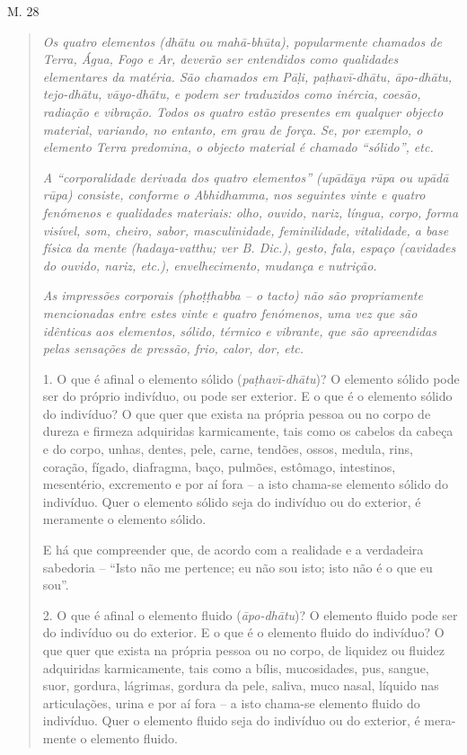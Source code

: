 M. 28

\begin{quote}
\emph{Os quatro elementos (dhātu ou mahā-bhūta), popularmente chamados de Terra, Água, Fogo e Ar, deverão ser entendidos como qualidades elementares da matéria. São chamados em Pāḷi, paṭhavī-dhātu, āpo-dhātu, tejo-dhātu, vāyo-dhātu, e podem ser traduzidos como inércia, coesão, radiação e vibração. Todos os quatro estão presentes em qualquer objecto material, variando, no entanto, em grau de força. Se, por exemplo, o elemento Terra predomina, o objecto material é chamado ``sólido'', etc.}

\emph{A ``corporalidade derivada dos quatro elementos'' (upādāya rūpa ou upādā rūpa) consiste, conforme o Abhidhamma, nos seguintes vinte e quatro fenómenos e qualidades materiais: olho, ouvido, nariz, língua, corpo, forma visível, som, cheiro, sabor, masculinidade, feminilidade, vitalidade, a base física da mente (hadaya-vatthu; ver B. Dic.), gesto, fala, espaço (cavidades do ouvido, nariz, etc.), envelhecimento, mudança e nutrição.}

\emph{As impressões corporais (phoṭṭhabba -- o tacto) não são propriamente mencionadas entre estes vinte e quatro fenómenos, uma vez que são idênticas aos elementos, sólido, térmico e vibrante, que são apreendidas pelas sensações de pressão, frio, calor, dor, etc.}

1. O que é afinal o elemento sólido (\emph{paṭhavī-dhātu})? O elemento sólido pode ser do próprio indivíduo, ou pode ser exterior. E o que é o elemento sólido do indivíduo? O que quer que exista na própria pessoa ou no corpo de dureza e firmeza adquiridas karmicamente, tais como os cabelos da cabeça e do corpo, unhas, dentes, pele, carne, tendões, ossos, medula, rins, coração, fígado, diafragma, baço, pulmões, estômago, intestinos, mesentério, excremento e por aí fora -- a isto chama-se elemento sólido do indivíduo. Quer o elemento sólido seja do indivíduo ou do exterior, é meramente o elemento sólido.

E há que compreender que, de acordo com a realidade e a verdadeira sabedoria -- ``Isto não me pertence; eu não sou isto; isto não é o que eu sou''.

2. O que é afinal o elemento fluido (\emph{āpo-dhātu})? O elemento fluido pode ser do indivíduo ou do exterior. E o que é o elemento fluido do indivíduo? O que quer que exista na própria pessoa ou no corpo, de liquidez ou fluidez adquiridas karmicamente, tais como a bílis, mucosidades, pus, sangue, suor, gordura, lágrimas, gordura da pele, saliva, muco nasal, líquido nas articulações, urina e por aí fora -- a isto chama-se elemento fluido do indivíduo. Quer o elemento fluido seja do indivíduo ou do exterior, é mera- mente o elemento fluido.


\end{quote}
